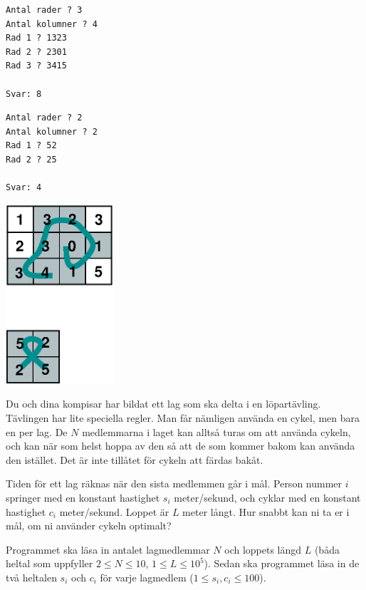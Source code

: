 \begin{multicols}{2}
\begin{verbatim}
Antal rader ? 3
Antal kolumner ? 4
Rad 1 ? 1323
Rad 2 ? 2301
Rad 3 ? 3415

Svar: 8
\end{verbatim}



\begin{verbatim}
Antal rader ? 2
Antal kolumner ? 2
Rad 1 ? 52
Rad 2 ? 25

Svar: 4
\end{verbatim}

\vfill\columnbreak
\includegraphics[width=0.3\textwidth]{planetbackefig.eps}

\end{multicols}


\newpage
{}

Du och dina kompisar har bildat ett lag som ska delta i en löpartävling. Tävlingen har lite speciella regler.
Man får nämligen använda en cykel, men bara en per lag. De $N$ medlemmarna i laget kan alltså turas om att använda cykeln, och kan
när som helst hoppa av den så att de som kommer bakom kan använda den istället. Det är inte tillåtet för cykeln att färdas bakåt.

Tiden för ett lag räknas när den sista medlemmen går i mål. Person nummer $i$ springer med en
konstant hastighet $s_i$ meter/sekund, och cyklar med en konstant hastighet $c_i$ meter/sekund. Loppet är $L$ meter långt.
Hur snabbt kan ni ta er i mål, om ni använder cykeln optimalt?

Programmet ska läsa in antalet lagmedlemmar $N$ och loppets längd $L$ (båda heltal som uppfyller $2 \leq N \leq 10$, $1 \leq L \leq 10^5$). Sedan ska programmet läsa in de två heltalen $s_i$ och $c_i$ för varje lagmedlem ($1 \leq s_i, c_i \leq 100$).

